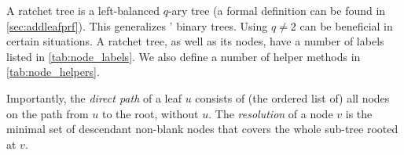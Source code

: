 A ratchet tree is a left-balanced $q$-ary tree (a formal definition can be found in \cref{sec:addleafprf}). This generalizes \protITK' binary trees. Using $q\neq2$ can be beneficial in certain situations.
A ratchet tree, as well as its nodes, have a number of labels listed in \cref{tab:node_labels}.
We also define a number of helper methods in \cref{tab:node_helpers}.
%


Importantly, the \emph{direct path} of a leaf $u$ consists of (the ordered list of) all nodes on the path from $u$ to the root, without $u$.
The \emph{resolution} of a node $v$ is the minimal set of descendant non-blank nodes that covers the whole sub-tree rooted at $v$. %


